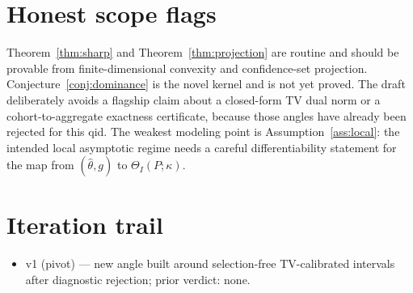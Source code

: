 \documentclass[11pt]{article}
\theoremstyle{definition}
\theoremstyle{plain}
\theoremstyle{remark}
\begin{document}
\section{Honest scope flags}
Theorem~\ref{thm:sharp} and Theorem~\ref{thm:projection} are routine and should be provable from finite-dimensional convexity and confidence-set projection. Conjecture~\ref{conj:dominance} is the novel kernel and is not yet proved. The draft deliberately avoids a flagship claim about a closed-form TV dual norm or a cohort-to-aggregate exactness certificate, because those angles have already been rejected for this qid. The weakest modeling point is Assumption~\ref{ass:local}: the intended local asymptotic regime needs a careful differentiability statement for the map from \((\hat\theta,g)\) to \(\Theta_I(P;\kappa)\).

\section{Iteration trail}
\begin{itemize}[leftmargin=*]
\item v1 (pivot) --- new angle built around selection-free TV-calibrated intervals after diagnostic rejection; prior verdict: none.
\end{itemize}
\end{document}
